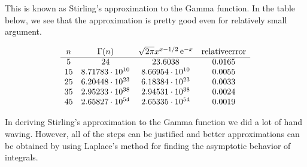 This is known as Stirling's approximation to the Gamma function.
In the table below, we see that the approximation is pretty good even for
relatively small argument.  



\[
\begin{matrix}
  n  & \Gamma(n)            & \sqrt{2 \pi} x^{x-1/2} \mathop{\mathrm{e}}\nolimits^{-x} & 
  \mathrm{relative error} \\
  \hline
  5  & 24                       & 23.6038               & 0.0165 \\
  15 & 8.71783 \cdot 10^{10}       & 8.66954 \cdot 10^{10}    & 0.0055 \\
  25 & 6.20448 \cdot 10^{23}       & 6.18384 \cdot 10^{23}    & 0.0033 \\
  35 & 2.95233 \cdot 10^{38}       & 2.94531 \cdot 10^{38}    & 0.0024 \\
  45 & 2.65827 \cdot 10^{54}       & 2.65335 \cdot 10^{54}    & 0.0019
\end{matrix}
\]

In deriving Stirling's approximation to the Gamma function we did a lot of 
hand waving.  However, all of the steps can be justified and better
approximations can be obtained by using Laplace's method for finding the
asymptotic behavior of integrals.














